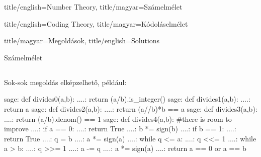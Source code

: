 \documentclass{amsbook}
\begin{document}
\maketitle

\setcounter{part}{1}
\begin{Part*}{ title/english=Number Theory, title/magyar={Számelmélet}}
  
  

\end{Part*}

\setcounter{part}{2}
\setcounter{section}{0}
\begin{Part*}{ title/english=Coding Theory, title/magyar=Kódoláselmélet}
    
\end{Part*}

\begin{Part*}{title/magyar=Megoldások, title/english=Solutions}

  \begin{section}{Számelmélet}

    \subsection{} Sok-sok megoldás elképzelhet\H o, például:
      \begin{sageexample}
          sage: def divides0(a,b):
          ....:     return (a/b).is_integer()
          sage: def divides1(a,b):
          ....:     return a %
          sage: def divides2(a,b):
          ....:     return (a//b)*b == a
          sage: def divides3(a,b):
          ....:     return (a/b).denom() == 1
          sage: def divides4(a,b): #there is room to improve
          ....:     if a == 0:
          ....:         return True
          ....:     b *= sign(b)
          ....:     if b == 1:
          ....:         return True
          ....:     q = b
          ....:     a *= sign(a)
          ....:     while q <= a:
          ....:         q <<= 1
          ....:     while a > b:
          ....:         q >>= 1
          ....:         a -= q  
          ....:         a *= sign(a)
          ....:     return a == 0 or a == b

      \end{sageexample}
  \end{section}

\end{Part*}
\end{document}
